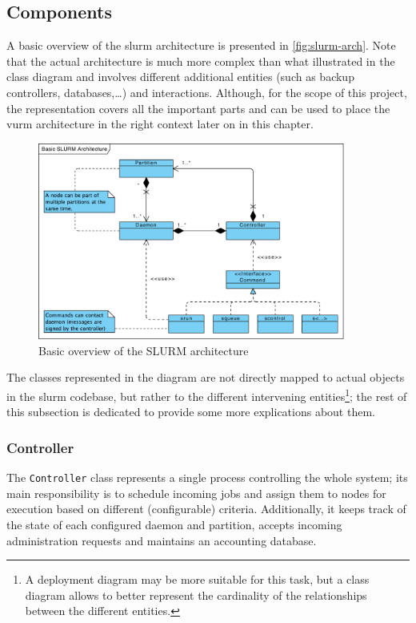 \subsection{Components}

A basic overview of the \gls{slurm} architecture is presented in \autoref{fig:slurm-arch}. Note that the actual architecture is much more complex than what illustrated in the class diagram and involves different additional entities (such as backup controllers, databases,…) and interactions. Although, for the scope of this project, the representation covers all the important parts and can be used to place the \gls{vurm} architecture in the right context later on in this chapter.

\begin{figure}[ht]
	\centering
	\includegraphics[width=0.9\textwidth]{figures/basic-slurm-arch}
	\caption{Basic overview of the SLURM architecture}
	\label{fig:slurm-arch}
\end{figure}

The classes represented in the diagram are not directly mapped to actual objects in the \gls{slurm} codebase, but rather to the different intervening entities\footnote{A deployment diagram may be more suitable for this task, but a class diagram allows to better represent the cardinality of the relationships between the different entities.}; the rest of this subsection is dedicated to provide some more explications about them.

\subsubsection{Controller}
The \texttt{Controller} class represents a single process controlling the whole system; its main responsibility is to schedule incoming jobs and assign them to nodes for execution based on different (configurable) criteria. Additionally, it keeps track of the state of each configured daemon and partition, accepts incoming administration requests and maintains an accounting database.

